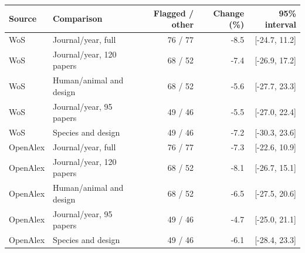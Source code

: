 \begin{tabular}{llrrr}
\toprule
Source & Comparison & Flagged / other & Change (\%) & 95\% interval \\
\midrule
WoS & Journal/year, full & 76 / 77 & -8.5 & [-24.7, 11.2] \\
WoS & Journal/year, 120 papers & 68 / 52 & -7.4 & [-26.9, 17.2] \\
WoS & Human/animal and design & 68 / 52 & -5.6 & [-27.7, 23.3] \\
WoS & Journal/year, 95 papers & 49 / 46 & -5.5 & [-27.0, 22.4] \\
WoS & Species and design & 49 / 46 & -7.2 & [-30.3, 23.6] \\
OpenAlex & Journal/year, full & 76 / 77 & -7.3 & [-22.6, 10.9] \\
OpenAlex & Journal/year, 120 papers & 68 / 52 & -8.1 & [-26.7, 15.1] \\
OpenAlex & Human/animal and design & 68 / 52 & -6.5 & [-27.5, 20.6] \\
OpenAlex & Journal/year, 95 papers & 49 / 46 & -4.7 & [-25.0, 21.1] \\
OpenAlex & Species and design & 49 / 46 & -6.1 & [-28.4, 23.3] \\
\bottomrule
\end{tabular}
